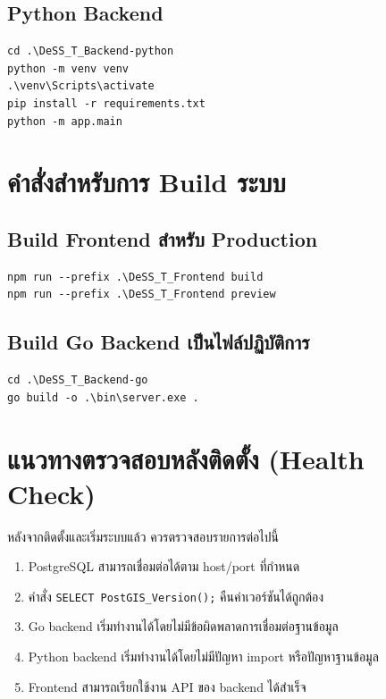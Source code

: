 \subsection{Python Backend}
\begin{verbatim}
cd .\DeSS_T_Backend-python
python -m venv venv
.\venv\Scripts\activate
pip install -r requirements.txt
python -m app.main
\end{verbatim}

\section{คำสั่งสำหรับการ Build ระบบ}
\subsection{Build Frontend สำหรับ Production}
\begin{verbatim}
npm run --prefix .\DeSS_T_Frontend build
npm run --prefix .\DeSS_T_Frontend preview
\end{verbatim}

\subsection{Build Go Backend เป็นไฟล์ปฏิบัติการ}
\begin{verbatim}
cd .\DeSS_T_Backend-go
go build -o .\bin\server.exe .
\end{verbatim}

\section{แนวทางตรวจสอบหลังติดตั้ง (Health Check)}
หลังจากติดตั้งและเริ่มระบบแล้ว ควรตรวจสอบรายการต่อไปนี้
\begin{enumerate}
    \item PostgreSQL สามารถเชื่อมต่อได้ตาม host/port ที่กำหนด
    \item คำสั่ง \texttt{SELECT PostGIS\_Version();} คืนค่าเวอร์ชันได้ถูกต้อง
    \item Go backend เริ่มทำงานได้โดยไม่มีข้อผิดพลาดการเชื่อมต่อฐานข้อมูล
    \item Python backend เริ่มทำงานได้โดยไม่มีปัญหา import หรือปัญหาฐานข้อมูล
    \item Frontend สามารถเรียกใช้งาน API ของ backend ได้สำเร็จ
\end{enumerate}

